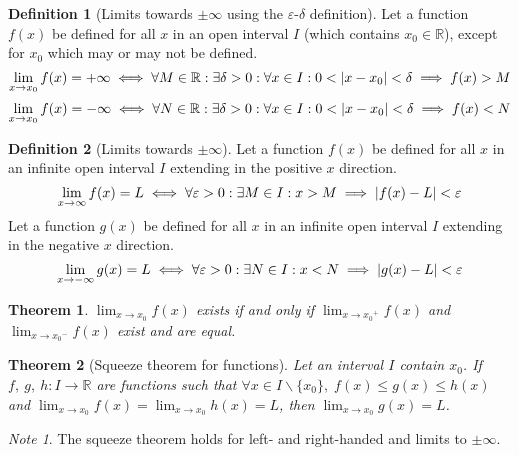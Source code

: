 \documentclass{article}
\newcommand*{\R}{\mathbb{R}}
\theoremstyle{plain}
\newtheorem{theorem}{Theorem}[section]
\numberwithin{theorem}{subsection}
\theoremstyle{definition}
\newtheorem{definition}{Definition}[section]
\numberwithin{definition}{subsection}
\theoremstyle{remark}
\newtheorem{note}{Note}[section]
\numberwithin{note}{subsection}
\begin{document}
%
\begin{definition}[Limits towards $\pm\infty$ using the $\varepsilon$-$\delta$ definition]
    Let a function $f(x)$ be defined for all $x$ in an open interval $I$
    (which contains $x_0 \in \R$), except for $x_0$ which may or may not be defined.
	\begin{equation*}
		\lim_{x\to x_0} f(x) = +\infty \iff \forall M \in \R: \exists\delta>0: \forall x \in I: 0<\abs{x-x_0}<\delta \implies f(x) > M
	\end{equation*}
	\begin{equation*}
    \lim_{x\to x_0} f(x) = -\infty \iff \forall N \in \R: \exists\delta>0: \forall x \in I: 0<\abs{x-x_0}<\delta \implies f(x) < N
	\end{equation*}
\end{definition}
%
\begin{definition}[Limits towards $\pm\infty$]
    Let a function $f(x)$ be defined for all $x$ in an infinite open interval $I$
    extending in the positive $x$ direction.
	\begin{equation*}
		\lim_{x\to\infty} f(x) = L \iff \forall \varepsilon>0: \exists M \in I: x>M \implies \abs{f(x)-L}<\varepsilon
	\end{equation*}
    Let a function $g(x)$ be defined for all $x$ in an infinite open interval $I$
    extending in the negative $x$ direction.
	\begin{equation*}
		\lim_{x\to-\infty} g(x) = L \iff \forall \varepsilon>0: \exists N \in I: x<N \implies \abs{g(x)-L}<\varepsilon
	\end{equation*}
\end{definition}
%
\begin{theorem}
    $\displaystyle\lim_{x\to x_0} f(x)$ exists if and only if
    $\displaystyle\lim_{x\to {x_0}^+} f(x)$ and $\displaystyle\lim_{x\to {x_0}^-} f(x)$
    exist and are equal.
\end{theorem}
%
\begin{theorem}[Squeeze theorem for functions]
    Let an interval $I$ contain $x_0$.
    If $f,\:g,\:h : I \to \R$ are functions such that
    $\forall x \in I\backslash\{x_0\},\; f(x)\leqslant g(x)\leqslant h(x)$
    and
    $\displaystyle\lim_{x\to x_0} f(x) = \lim_{x\to x_0} h(x) = L$,
    then
    $\displaystyle\lim_{x\to x_0} g(x) = L$.
\end{theorem}
%
\begin{note}
   The squeeze theorem holds for left- and right-handed and limits to $\pm\infty$.
\end{note}
\end{document}
